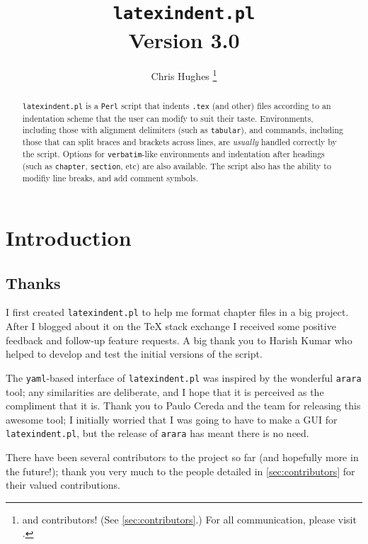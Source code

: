 \documentclass[8pt]{article}
\begin{document}
	\title{\lstinline[basicstyle=\huge\ttfamily]!latexindent.pl!\\[1cm]
		Version 3.0}
\author{Chris Hughes \footnote{and contributors! (See \vref{sec:contributors}.) For 
all communication, please visit \cite{latexindent-home}.}}
\maketitle
\begin{abstract}
	\texttt{latexindent.pl} is a \texttt{Perl} script that indents \texttt{.tex} (and other)
	files according to an indentation scheme that the user can modify to suit their
	taste. Environments, including those with alignment delimiters (such as \texttt{tabular}),
	and commands, including those that can split braces and brackets across lines,
	are \emph{usually} handled correctly by the script. Options for \texttt{verbatim}-like
	environments and indentation after headings (such as \lstinline!chapter!, \lstinline!section!, etc)
	are also available. The script also has the ability to modifiy line breaks, and add 
    comment symbols.
\end{abstract}
\tableofcontents
\lstlistoflistings

\section{Introduction}
\subsection{Thanks}
I first created \texttt{latexindent.pl} to help me format chapter files
in a big project. After I blogged about it on the
\TeX{} stack exchange \cite{cmhblog} I received some positive feedback and
follow-up feature requests. A big thank you to Harish Kumar who 
helped to develop and test the initial versions of the script.

The \texttt{yaml}-based interface of \texttt{latexindent.pl} was inspired
by the wonderful \texttt{arara} tool; any similarities are deliberate, and
I hope that it is perceived as the compliment that it is. Thank you to Paulo Cereda and the
team for releasing this awesome tool; I initially worried that I was going to
have to make a GUI for \texttt{latexindent.pl}, but the release of \texttt{arara}
has meant there is no need. 

There have been several contributors to the project so far (and hopefully more in
the future!); thank you very much to the people detailed in \vref{sec:contributors}
for their valued contributions.
\end{document}
